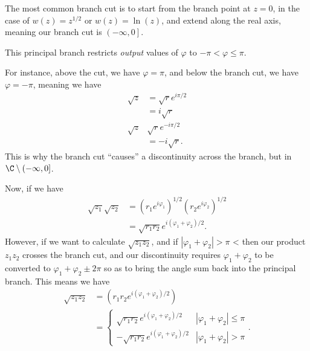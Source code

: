 \documentclass[10pt]{mypackage}
\begin{document}
\begin{example}
  The most common branch cut is to start from the branch point at $z = 0$, in the case of $w(z) = z^{1/2}$ or $w(z) = \ln(z)$, and extend along the real axis, meaning our branch cut is $\left( -\infty,0 \right]$.\newline

  This principal branch restricts \textit{output} values of $\varphi$ to $-\pi < \varphi \leq \pi$.\newline

  For instance, above the cut, we have $\varphi = \pi$, and below the branch cut, we have $\varphi = -\pi$, meaning we have
  \begin{align*}
    \sqrt{z} &= \sqrt{r}e^{i\pi /2}\tag*{$\varphi \to \pi$}\\
             &= i\sqrt{r}\\
    \sqrt{z} & \sqrt{r}e^{-i\pi/2}\tag*{$\varphi \to -\pi$}\\
             &= -i\sqrt{r}.
  \end{align*}
  This is why the branch cut ``causes'' a discontinuity across the branch, but in $\C\setminus (-\infty,0]$.\newline

  Now, if we have
  \begin{align*}
    \sqrt{z_1}\sqrt{z_2} &= \left( r_1e^{i\varphi_1} \right)^{1/2}\left( r_2e^{i\varphi_2} \right)^{1/2}\\
                         &= \sqrt{r_1r_2}e^{i\left( \varphi_1 + \varphi_2 \right)/2}.
  \end{align*}
  However, if we want to calculate $\sqrt{z_1z_2}$, and if $\left\vert \varphi_1 + \varphi_2 \right\vert > \pi$ < then our product $z_1z_2$ crosses the branch cut, and our discontinuity requires $\varphi_1 + \varphi_2 $ to be converted to $\varphi_1 + \varphi_2 \pm 2\pi$ so as to bring the angle sum back into the principal branch. This means we have
  \begin{align*}
    \sqrt{z_1z_2} &= \left( r_1r_2e^{i\left( \varphi_1 + \varphi_2 \right)/2} \right)\\
                  &= \begin{cases}
                    \sqrt{r_1r_2}e^{i\left( \varphi_1 + \varphi_2 \right)/2} & \left\vert \varphi_1 + \varphi_2 \right\vert \leq \pi\\
                    -\sqrt{r_1r_2}e^{i\left( \varphi_1+\varphi_2 \right)/2} & \left\vert \varphi_1 + \varphi_2 \right\vert > \pi
                  \end{cases}.
  \end{align*}
\end{example}
\end{document}
